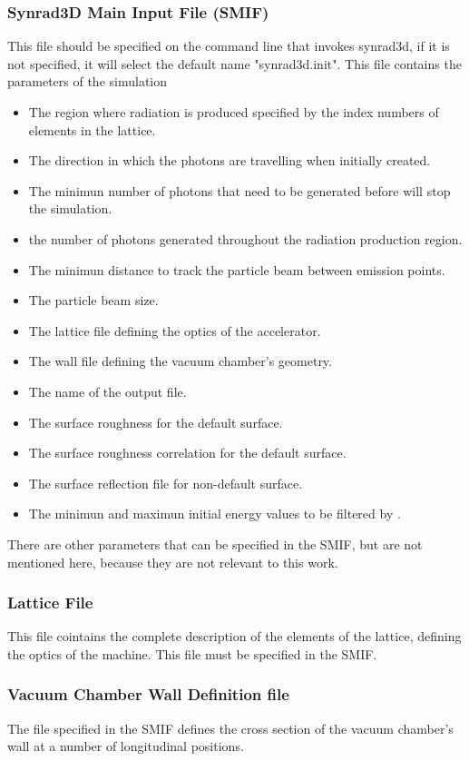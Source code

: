 \subsubsection*{Synrad3D Main Input File (SMIF)}
\label{smif}
This file should be specified on the command line that invokes synrad3d, if it is not specified, it will select the default name "synrad3d.init". This file contains the parameters of the simulation
\begin{itemize}
\item The region where radiation is produced specified by the index numbers of elements in the lattice.
\item The direction in which the photons are travelling when initially created. 
\item The minimun number of photons that need to be generated before \srthree will stop the simulation.  
\item the number of photons generated throughout the radiation production region.
\item The minimun distance to track the particle beam between emission points.
\item The particle beam size.
\item The lattice file defining the optics of the accelerator.
\item The wall file defining the vacuum chamber's geometry.
\item The name of the output file.
\item The surface roughness for the default surface.
\item The surface roughness correlation for the default surface.
\item The surface reflection file for non-default surface.
\item The minimun and maximun initial energy values to be filtered by \srthree .
\end{itemize}
There are other parameters that can be specified in the SMIF, but are not mentioned here, because they are not relevant to this work.

\subsubsection*{Lattice File}
This file cointains the complete description of the elements of the lattice, defining the optics of the machine. This file must be specified in the SMIF.
\subsubsection*{Vacuum Chamber Wall Definition file}
The file specified in the SMIF defines the cross section of the vacuum chamber's wall at a number of longitudinal positions.
